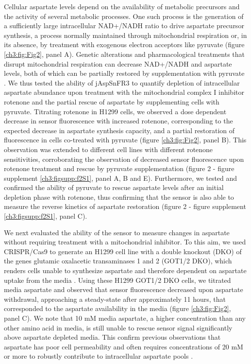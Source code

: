 Cellular aspartate levels depend on the availability of metabolic precursors and the activity of several metabolic processes.
One such process is the generation of a sufficiently large intracellular NAD+/NADH ratio to drive aspartate precursor synthesis, a process normally maintained through mitochondrial respiration or, in its absence, by treatment with exogenous electron acceptors like pyruvate (figure \ref{ch3:fig:Fig2}, panel A).
Genetic alterations and pharmacological treatments that disrupt mitochondrial respiration can decrease NAD+/NADH and aspartate levels, both of which can be partially restored by supplementation with pyruvate \cite{Sullivan2015-xf, Birsoy2015-pg}.
We thus tested the ability of jAspSnFR3 to quantify depletion of intracellular aspartate abundance upon treatment with the mitochondrial complex I inhibitor rotenone and the partial rescue of aspartate by supplementing cells with pyruvate.
Titrating rotenone in H1299 cells, we observed a dose dependent decrease in sensor fluorescence with increased rotenone, corresponding to the expected decrease in aspartate synthesis capacity, and a partial restoration of fluorescence in cells co-treated with pyruvate (figure \ref{ch3:fig:Fig2}, panel B).
This observation was extended to different cell lines with different rotenone sensitivities, corroborating the observation of decreased sensor fluorescence upon rotenone treatment and rescue by pyruvate supplementation (figure 2 - figure supplement \ref{ch3:figsupp:f2S1}, panel A, B and E).
Furthermore, we tested and confirmed the ability of pyruvate to rescue aspartate levels after an initial depletion phase with rotenone, thus confirming that the sensor is also able to measure the reverse kinetics of aspartate restoration (figure 2 - figure supplement \ref{ch3:figsupp:f2S1}, panel C).

We next evaluated the ability of the sensor to measure changes in aspartate without requiring treatment with a mitochondrial inhibitor.
To this aim, we used CRISPR/Cas9 to generate an H1299 cell line with a double knockout (DKO) of the genes glutamic oxalacetic transaminases 1 and 2 (GOT1/2 DKO), which renders cells unable to synthesize aspartate and therefore dependent on aspartate uptake from the media \cite{Garcia-Bermudez2022-qn}.
Using these H1299 GOT1/2 DKO cells, we titrated media aspartate and observed that sensor fluorescence decreased upon aspartate withdrawal, approaching a steady-state after approximately 11 hours, that corresponded to the aspartate availability in the media (figure \ref{ch3:fig:Fig2}, panel C).
We note that 10 mM media aspartate, a higher concentration than any other amino acid in media, is still unable to rescue sensor signal significantly above aspartate depleted media.
This confirm previous observations that aspartate has poor cell permeability and often requires concentrations of 20 mM or more to robustly contribute to intracellular aspartate pools \cite{Sullivan2018-gz}.

